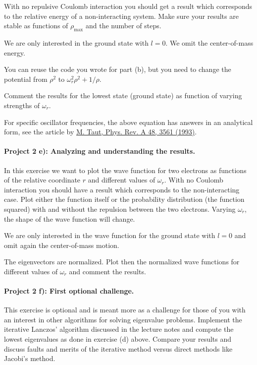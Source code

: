 \documentclass[%
oneside,                 %
final,                   %
10pt]{article}
\begin{document}
With no repulsive Coulomb interaction 
you should get a result which corresponds to 
the relative energy of a non-interacting system.   
Make sure your results are 
stable as functions of $\rho_{\mathrm{max}}$ and the number of steps.

We are only interested in the ground state with $l=0$. We omit the 
center-of-mass energy.

You can reuse the code you wrote for part (b), 
but you need to change the potential from $\rho^2$ to $\omega_r^2\rho^2+1/\rho$. 

Comment the results for the lowest state (ground state) as function of
varying strengths of $\omega_r$. 


For specific oscillator frequencies, the above equation has answers in an analytical form,
see the article by \href{{http://prola.aps.org/abstract/PRA/v48/i5/p3561_1}}{M. Taut, Phys. Rev. A 48, 3561 (1993)}.



\paragraph{Project 2 e): Analyzing and understanding the results.}
In this exercise we want to plot the wave function 
for two electrons as functions of the relative coordinate $r$ and different
values of $\omega_r$.  With no Coulomb interaction you should have a result which corresponds to the non-interacting case. 
Plot either the function itself or the probability distribution (the function squared) with and without the repulsion between the two electrons.
Varying $\omega_r$, the shape of the wave function
will change.  

We are only interested in the wave function for the ground state with $l=0$ and
omit again the  center-of-mass motion.

The eigenvectors are normalized. 
Plot then the normalized wave functions for different  values of $\omega_r$ and comment the results.

\paragraph{Project 2 f): First optional challenge.}
This exercise is optional and is meant more as a challenge for those of you with an interest in other algorithms for solving eigenvalue problems. 
Implement the iterative Lanczos' algorithm discussed in the lecture notes and compute the lowest eigenvalues 
as done in exercise (d) above. Compare your results and discuss faults and merits of the iterative method versus
direct methods like Jacobi's method. 
\end{document}

